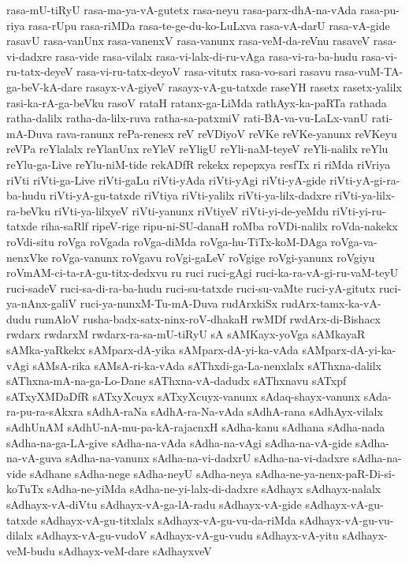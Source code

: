 {rasa-mU-tiRyU
rasa-ma-ya-vA-gutetx
rasa-neyu
rasa-parx-dhA-na-vAda
rasa-pu-riya
rasa-rUpu
rasa-riMDa
rasa-te-ge-du-ko-LuLxva
rasa-vA-darU
rasa-vA-gide
rasavU
rasa-vanUnx
rasa-vanenxV
rasa-vanunx
rasa-veM-da-reVnu
rasaveV
rasa-vi-dadxre
rasa-vide
rasa-vilalx
rasa-vi-lalx-di-ru-vAga
rasa-vi-ra-ba-hudu
rasa-vi-ru-tatx-deyeV
rasa-vi-ru-tatx-deyoV
rasa-vitutx
rasa-vo-sari
rasavu
rasa-vuM-TA-ga-beV-kA-dare
rasayx-vA-giyeV
rasayx-vA-gu-tatxde
raseYH
rasetx
rasetx-yalilx
rasi-ka-rA-ga-beVku
rasoV
rataH
ratanx-ga-LiMda
rathAyx-ka-paRTa
rathada
ratha-dalilx
ratha-da-lilx-ruva
ratha-sa-patxmiV
rati-BA-va-vu-LaLx-vanU
rati-mA-Duva
rava-ranunx
rePa-renesx
reV
reVDiyoV
reVKe
reVKe-yanunx
reVKeyu
reVPa
reYlalalx
reYlanUnx
reYleV
reYligU
reYli-naM-teyeV
reYli-nalilx
reYlu
reYlu-ga-Live
reYlu-niM-tide
rekADfR
rekekx
repepxya
resfTx
ri
riMda
riVriya
riVti
riVti-ga-Live
riVti-gaLu
riVti-yAda
riVti-yAgi
riVti-yA-gide
riVti-yA-gi-ra-ba-hudu
riVti-yA-gu-tatxde
riVtiya
riVti-yalilx
riVti-ya-lilx-dadxre
riVti-ya-lilx-ra-beVku
riVti-ya-lilxyeV
riVti-yanunx
riVtiyeV
riVti-yi-de-yeMdu
riVti-yi-ru-tatxde
riha-saRlf
ripeV-rige
ripu-ni-SU-danaH
roMba
roVDi-nalilx
roVda-nakekx
roVdi-situ
roVga
roVgada
roVga-diMda
roVga-hu-TiTx-koM-DAga
roVga-va-nenxVke
roVga-vanunx
roVgavu
roVgi-gaLeV
roVgige
roVgi-yanunx
roVgiyu
roVmAM-ci-ta-rA-gu-titx-dedxvu
ru
ruci
ruci-gAgi
ruci-ka-ra-vA-gi-ru-vaM-teyU
ruci-sadeV
ruci-sa-di-ra-ba-hudu
ruci-su-tatxde
ruci-su-vaMte
ruci-yA-gitutx
ruci-ya-nAnx-galiV
ruci-ya-nunxM-Tu-mA-Duva
rudArxkiSx
rudArx-tamx-ka-vA-dudu
rumAloV
rusha-badx-satx-ninx-roV-dhakaH
rwMDf
rwdArx-di-Bishacx
rwdarx
rwdarxM
rwdarx-ra-sa-mU-tiRyU
sA
sAMKayx-yoVga
sAMkayaR
sAMka-yaRkekx
sAMparx-dA-yika
sAMparx-dA-yi-ka-vAda
sAMparx-dA-yi-ka-vAgi
sAMsA-rika
sAMsA-ri-ka-vAda
sAThxdi-ga-La-nenxlalx
sAThxna-dalilx
sAThxna-mA-na-ga-Lo-Dane
sAThxna-vA-dadudx
sAThxnavu
sATxpf
sATxyXMDaDfR
sATxyXcuyx
sATxyXcuyx-vanunx
sAdaq-shayx-vanunx
sAda-ra-pu-ra-sAkxra
sAdhA-raNa
sAdhA-ra-Na-vAda
sAdhA-rana
sAdhAyx-vilalx
sAdhUnAM
sAdhU-nA-mu-pa-kA-rajacnxH
sAdha-kanu
sAdhana
sAdha-nada
sAdha-na-ga-LA-give
sAdha-na-vAda
sAdha-na-vAgi
sAdha-na-vA-gide
sAdha-na-vA-guva
sAdha-na-vanunx
sAdha-na-vi-dadxrU
sAdha-na-vi-dadxre
sAdha-na-vide
sAdhane
sAdha-nege
sAdha-neyU
sAdha-neya
sAdha-ne-ya-nenx-paR-Di-si-koTuTx
sAdha-ne-yiMda
sAdha-ne-yi-lalx-di-dadxre
sAdhayx
sAdhayx-nalalx
sAdhayx-vA-diVtu
sAdhayx-vA-ga-lA-radu
sAdhayx-vA-gide
sAdhayx-vA-gu-tatxde
sAdhayx-vA-gu-titxlalx
sAdhayx-vA-gu-vu-da-riMda
sAdhayx-vA-gu-vu-dilalx
sAdhayx-vA-gu-vudoV
sAdhayx-vA-gu-vudu
sAdhayx-vA-yitu
sAdhayx-veM-budu
sAdhayx-veM-dare
sAdhayxveV
}
